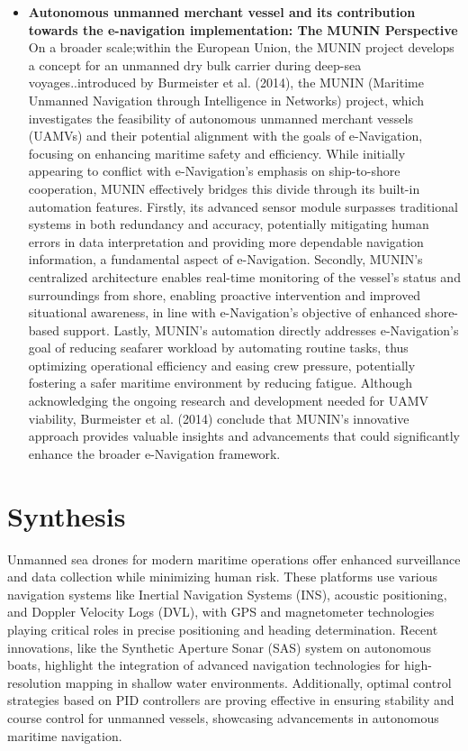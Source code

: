 \begin{itemize}
\item {\bf Autonomous unmanned merchant vessel and its contribution towards the e-navigation implementation: The MUNIN Perspective} \\
On a broader scale;within the European Union, the MUNIN project develops a concept for an unmanned dry bulk carrier 
during deep-sea voyages..introduced by Burmeister et al. (2014), the MUNIN (Maritime Unmanned Navigation through 
Intelligence in Networks)  project, which investigates the feasibility of autonomous unmanned merchant vessels (UAMVs) 
and their potential alignment with the goals of e-Navigation, focusing on enhancing maritime safety and efficiency. 
While initially appearing to conflict with e-Navigation's emphasis on ship-to-shore cooperation, MUNIN effectively 
bridges this divide through its built-in automation features. Firstly, its advanced sensor module surpasses traditional 
systems in both redundancy and accuracy, potentially mitigating human errors in data interpretation and providing more 
dependable navigation information, a fundamental aspect of e-Navigation. Secondly, MUNIN's centralized architecture 
enables real-time monitoring of the vessel's status and surroundings from shore, enabling proactive intervention and 
improved situational awareness, in line with e-Navigation's objective of enhanced shore-based support. Lastly, MUNIN's 
automation directly addresses e-Navigation's goal of reducing seafarer workload by automating routine tasks, thus 
optimizing operational efficiency and easing crew pressure, potentially fostering a safer maritime environment by 
reducing fatigue. Although acknowledging the ongoing research and development needed for UAMV viability, Burmeister 
et al. (2014) conclude that MUNIN's innovative approach provides valuable insights and advancements that could 
significantly enhance the broader e-Navigation framework.
\end{itemize}

\section{Synthesis}
Unmanned sea drones for modern maritime operations offer enhanced surveillance and data collection while minimizing human 
risk. These platforms use various navigation systems like Inertial Navigation Systems (INS), acoustic positioning, and 
Doppler Velocity Logs (DVL), with GPS and magnetometer technologies playing critical roles in precise positioning and 
heading determination. Recent innovations, like the Synthetic Aperture Sonar (SAS) system on autonomous boats, highlight 
the integration of advanced navigation technologies for high-resolution mapping in shallow water environments. 
Additionally, optimal control strategies based on PID controllers are proving effective in ensuring stability and course 
control for unmanned vessels, showcasing advancements in autonomous maritime navigation.

